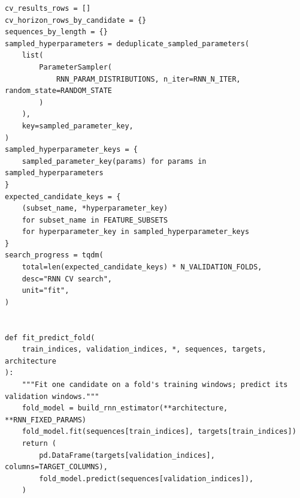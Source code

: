 \begin{verbatim}
cv_results_rows = []
cv_horizon_rows_by_candidate = {}
sequences_by_length = {}
sampled_hyperparameters = deduplicate_sampled_parameters(
    list(
        ParameterSampler(
            RNN_PARAM_DISTRIBUTIONS, n_iter=RNN_N_ITER, random_state=RANDOM_STATE
        )
    ),
    key=sampled_parameter_key,
)
sampled_hyperparameter_keys = {
    sampled_parameter_key(params) for params in sampled_hyperparameters
}
expected_candidate_keys = {
    (subset_name, *hyperparameter_key)
    for subset_name in FEATURE_SUBSETS
    for hyperparameter_key in sampled_hyperparameter_keys
}
search_progress = tqdm(
    total=len(expected_candidate_keys) * N_VALIDATION_FOLDS,
    desc="RNN CV search",
    unit="fit",
)


def fit_predict_fold(
    train_indices, validation_indices, *, sequences, targets, architecture
):
    """Fit one candidate on a fold's training windows; predict its validation windows."""
    fold_model = build_rnn_estimator(**architecture, **RNN_FIXED_PARAMS)
    fold_model.fit(sequences[train_indices], targets[train_indices])
    return (
        pd.DataFrame(targets[validation_indices], columns=TARGET_COLUMNS),
        fold_model.predict(sequences[validation_indices]),
    )



\end{verbatim}
